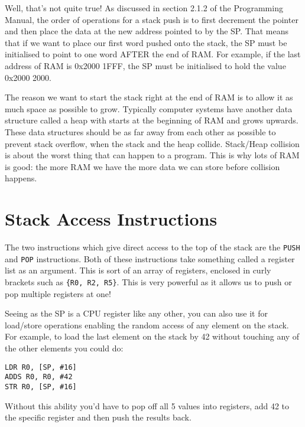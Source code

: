 Well, that's not quite true! As discussed in section 2.1.2 of the Programming Manual, the order of operations for a stack push is to first decrement the pointer and then place the data at the new address pointed to by the SP. That means that if we want to place our first word pushed onto the stack, the SP must be initialised to point to one word AFTER the end of RAM. For example, if the last address of RAM is 0x2000 1FFF, the SP must be initialised to hold the value 0x2000 2000.

The reason we want to start the stack right at the end of RAM is to allow it as much space as possible to grow. Typically computer systems have another data structure called a heap with starts at the beginning of RAM and grows upwards. These data structures should be as far away from each other as possible to prevent stack overflow, when the stack and the heap collide. Stack/Heap collision is about the worst thing that can happen to a program. This is why lots of RAM is good: the more RAM we have the more data we can store before collision happens. 

\section{Stack Access Instructions}
The two instructions which give direct access to the top of the stack are the \texttt{PUSH} and \texttt{POP} instructions. Both of these instructions take something called a register list as an argument. This is sort of an array of registers, enclosed in curly brackets such as \texttt{\{R0, R2, R5\}}. This is very powerful as it allows us to push or pop multiple registers at one!

Seeing as the SP is a CPU register like any other, you can also use it for load/store operations enabling the random access of any element on the stack. For example, to load the  last element on the stack by 42 without touching any of the other elements you could do:
\begin{lstlisting}[fontadjust=true,frame=trBL]
LDR R0, [SP, #16]
ADDS R0, R0, #42
STR R0, [SP, #16]
\end{lstlisting}
Without this ability you'd have to pop off all 5 values into registers, add 42 to the specific register and then push the results back.
